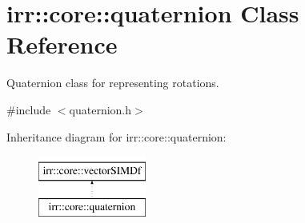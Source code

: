 \hypertarget{classirr_1_1core_1_1quaternion}{}\section{irr\+:\+:core\+:\+:quaternion Class Reference}
\label{classirr_1_1core_1_1quaternion}


Quaternion class for representing rotations.  




{\ttfamily \#include $<$quaternion.\+h$>$}

Inheritance diagram for irr\+:\+:core\+:\+:quaternion\+:\begin{figure}[H]
\begin{center}
\leavevmode
\includegraphics[height=2.000000cm]{classirr_1_1core_1_1quaternion}
\end{center}
\end{figure}
